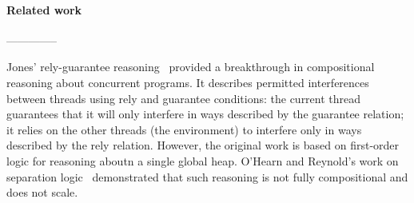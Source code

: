 \paragraph{Related work}

--------------

Jones' rely-guarantee reasoning~\cite{rg} provided a
breakthrough in compositional reasoning about concurrent programs. It
describes permitted interferences between threads using rely and
guarantee conditions: the current thread guarantees that it will only
interfere in ways described by the guarantee relation; it relies on
the other threads (the environment) to interfere only  in ways
described by the rely relation. However, the original work is based on
first-order logic for reasoning aboutn
a single global heap. O'Hearn and Reynold's
work on separation logic~\cite{2001popland john's survey} demonstrated that such reasoning is not
fully compositional and does not scale. 

